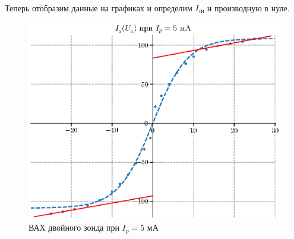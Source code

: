 \documentclass[12pt,a4paper]{article}
\begin{document}
Теперь отобразим данные на графиках и определим $I_{iн}$ и производную в нуле.

\begin{figure}[H]
    \centering
    \includegraphics[width=0.7\linewidth]{pics/UI1.eps}
    \caption{ВАХ двойного зонда при $I_p = 5$ мА}
\end{figure}
\end{document}
